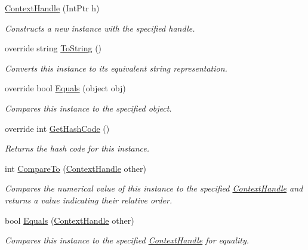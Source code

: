 \begin{DoxyCompactItemize}
\item 
\hyperlink{struct_open_t_k_1_1_context_handle_a9f28d608f392e028316170761d838579}{Context\-Handle} (Int\-Ptr h)
\begin{DoxyCompactList}\small\item\em Constructs a new instance with the specified handle. \end{DoxyCompactList}\item 
override string \hyperlink{struct_open_t_k_1_1_context_handle_a20cadbf82331ed88599b86cd2129aec2}{To\-String} ()
\begin{DoxyCompactList}\small\item\em Converts this instance to its equivalent string representation. \end{DoxyCompactList}\item 
override bool \hyperlink{struct_open_t_k_1_1_context_handle_ad0c7d1aaa648f1c891b0928f00ca9b9c}{Equals} (object obj)
\begin{DoxyCompactList}\small\item\em Compares this instance to the specified object. \end{DoxyCompactList}\item 
override int \hyperlink{struct_open_t_k_1_1_context_handle_abd04bc3828451409789d7296d9e2122e}{Get\-Hash\-Code} ()
\begin{DoxyCompactList}\small\item\em Returns the hash code for this instance. \end{DoxyCompactList}\item 
int \hyperlink{struct_open_t_k_1_1_context_handle_a179bf07f12867e4ab9c8dc52becea6b3}{Compare\-To} (\hyperlink{struct_open_t_k_1_1_context_handle}{Context\-Handle} other)
\begin{DoxyCompactList}\small\item\em Compares the numerical value of this instance to the specified \hyperlink{struct_open_t_k_1_1_context_handle}{Context\-Handle} and returns a value indicating their relative order. \end{DoxyCompactList}\item 
bool \hyperlink{struct_open_t_k_1_1_context_handle_aa086559f49576c119614c41698d05ca8}{Equals} (\hyperlink{struct_open_t_k_1_1_context_handle}{Context\-Handle} other)
\begin{DoxyCompactList}\small\item\em Compares this instance to the specified \hyperlink{struct_open_t_k_1_1_context_handle}{Context\-Handle} for equality. \end{DoxyCompactList}\end{DoxyCompactItemize}
